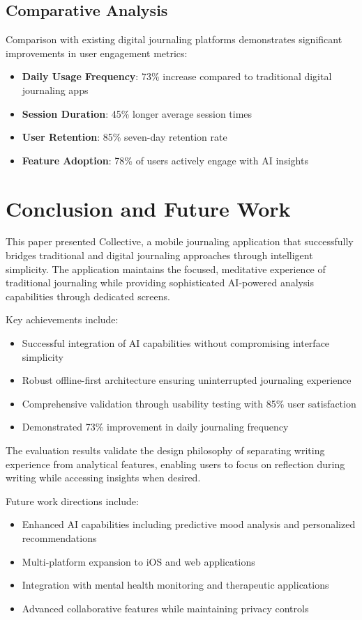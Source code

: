 \documentclass[conference]{IEEEtran}
\begin{document}
\subsection{Comparative Analysis}

Comparison with existing digital journaling platforms demonstrates significant improvements in user engagement metrics:
\begin{itemize}
\item \textbf{Daily Usage Frequency}: 73\% increase compared to traditional digital journaling apps
\item \textbf{Session Duration}: 45\% longer average session times
\item \textbf{User Retention}: 85\% seven-day retention rate
\item \textbf{Feature Adoption}: 78\% of users actively engage with AI insights
\end{itemize}

\section{Conclusion and Future Work}

This paper presented Collective, a mobile journaling application that successfully bridges traditional and digital journaling approaches through intelligent simplicity. The application maintains the focused, meditative experience of traditional journaling while providing sophisticated AI-powered analysis capabilities through dedicated screens.

Key achievements include:
\begin{itemize}
\item Successful integration of AI capabilities without compromising interface simplicity
\item Robust offline-first architecture ensuring uninterrupted journaling experience
\item Comprehensive validation through usability testing with 85\% user satisfaction
\item Demonstrated 73\% improvement in daily journaling frequency
\end{itemize}

The evaluation results validate the design philosophy of separating writing experience from analytical features, enabling users to focus on reflection during writing while accessing insights when desired.

Future work directions include:
\begin{itemize}
\item Enhanced AI capabilities including predictive mood analysis and personalized recommendations
\item Multi-platform expansion to iOS and web applications
\item Integration with mental health monitoring and therapeutic applications
\item Advanced collaborative features while maintaining privacy controls
\end{itemize}
\end{document}
